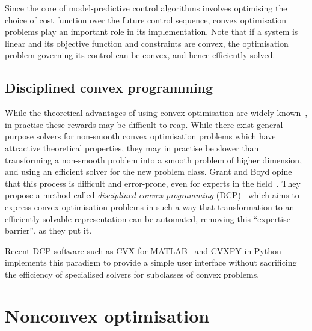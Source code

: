 Since the core of model-predictive control algorithms involves optimising the choice of cost function over the future control sequence, convex optimisation problems play an important role in its implementation.
Note that if a system is linear and its objective function and constraints are convex, the optimisation problem governing its control can be convex, and hence efficiently solved.

\subsection{Disciplined convex programming}

While the theoretical advantages of using convex optimisation are widely known~\cite{Luo06}, in practise these rewards may be difficult to reap.
While there exist general-purpose solvers for non-smooth convex optimisation problems which have attractive theoretical properties, they may in practise be slower than transforming a non-smooth problem into a smooth problem of higher dimension, and using an efficient solver for the new problem class.
Grant and Boyd opine that this process is difficult and error-prone, even for experts in the field~\cite{Grant08}.
They propose a method called \emph{disciplined convex programming} (DCP)~\cite{Grant06} which aims to express convex optimisation problems in such a way that transformation to an efficiently-solvable representation can be automated, removing this ``expertise barrier'', as they put it.

Recent DCP software such as CVX for MATLAB~\cite{CVX} and CVXPY in Python~\cite{CVXPY} implements this paradigm to provide a simple user interface without sacrificing the efficiency of specialised solvers for subclasses of convex problems.

\section{Nonconvex optimisation}

